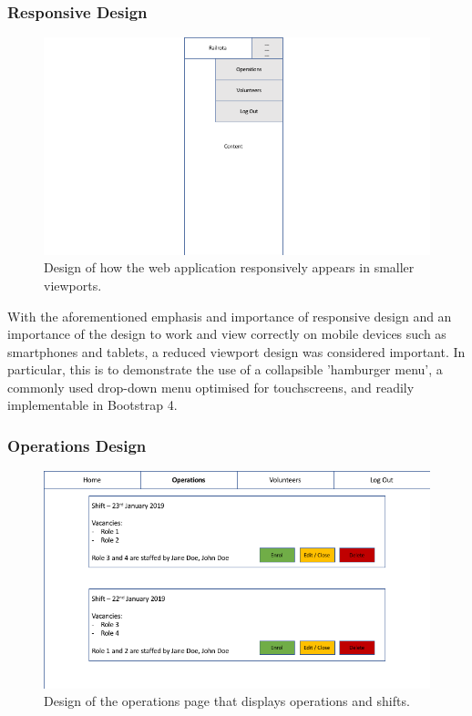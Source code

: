 \subsubsection{Responsive Design}
\begin{figure}[!ht]
    \includegraphics[width=1.0\textwidth]{Figures/design-mobile}
    \caption{Design of how the web application responsively appears in smaller viewports.}
    \label{fig:mobile}
\end{figure}

With the aforementioned emphasis and importance of responsive design and an importance of the design to work and view correctly on mobile devices such as smartphones and tablets, a reduced viewport design was considered important. In particular, this is to demonstrate the use of a collapsible 'hamburger menu', a commonly used drop-down menu optimised for touchscreens, and readily implementable in Bootstrap 4. \cite{Bootstrap4}

\subsubsection{Operations Design}
\begin{figure}[!ht]
    \includegraphics[width=1.0\textwidth]{Figures/design-operations}
    \caption{Design of the operations page that displays operations and shifts.}
    \label{fig:operations}
\end{figure}

